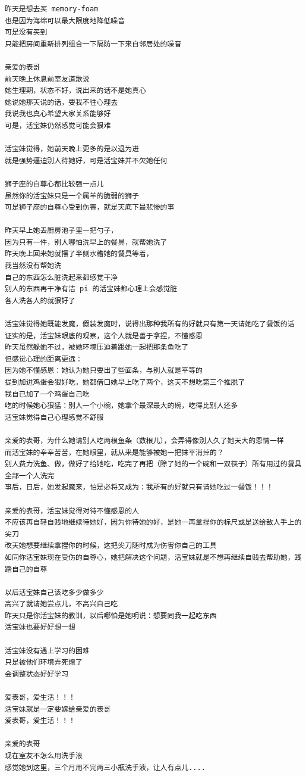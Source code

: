 \documentclass[9pt, b5paper]{article}
\begin{document}
\begin{enumerate}
\begin{verbatim}
昨天是想去买 memory-foam
也是因为海绵可以最大限度地降低噪音
可是没有买到
只能把房间重新排列组合一下隔防一下来自邻居处的噪音

亲爱的表哥
前天晚上休息前室友道歉说
她生理期，状态不好，说出来的话不是她真心
她说她那天说的话，要我不往心理去
我说我也真心希望大家关系能够好
可是，活宝妹仍然感觉可能会狠难

活宝妹觉得，她前天晚上更多的是以退为进
就是强势逼迫别人待她好，可是活宝妹并不欠她任何

狮子座的自尊心都比较强一点儿
虽然你的活宝妹只是一个属羊的脆弱的狮子
可是狮子座的自尊心受到伤害，就是天底下最悲惨的事

昨天早上她丢厨房池子里一把勺子，
因为只有一件，别人哪怕洗早上的餐具，就帮她洗了
昨天晚上回来她就摆了半侧水槽她的餐具等着，
我当然没有帮她洗
自己的东西怎么脏洗起来都感觉干净
别人的东西再干净有洁 pi 的活宝妹都心理上会感觉脏
各人洗各人的就狠好了

活宝妹觉得她既能发魔，假装发魔时，说得出那种我所有的好就只有第一天请她吃了餐饭的话
证实的是，活宝妹眼底的观察，这个人就是善于拿捏，不懂感恩
昨天虽然躲她不过，被她环境压迫着跟她一起把那条鱼吃了
但感觉心理的距离更远：
因为她不懂感恩：她认为她只要出了些面条，与别人就是平等的
提到加进鸡蛋会狠好吃，她都借口她早上吃了两个，这天不想吃第三个推脱了
我自已加了一个鸡蛋自己吃
吃的时候她心狠猛：别人一个小碗，她拿个最深最大的碗，吃得比别人还多
活宝妹觉得自己心理感觉不舒服

亲爱的表哥，为什么她请别人吃两根鱼条（数根儿），会弄得像别人久了她天大的恩情一样
而活宝妹的辛辛苦苦，在她眼里，就从来是能够被她一把抹平消掉的？
别人费力洗鱼、做，做好了给她吃，吃完了再把（除了她的一个碗和一双筷子）所有用过的餐具全部一个人洗完
事后，日后，她发起魔来，怕是必将又成为：我所有的好就只有请她吃过一餐饭！！！

亲爱的表哥，活宝妹觉得对待不懂感恩的人
不应该再自轻自贱地继续待她好，因为你待她的好，是她一再拿捏你的标尺或是送给敌人手上的尖刀
改天她想要继续拿捏你的时候，这把尖刀随时成为伤害你自己的工具
如同你活宝妹现在受伤的自尊心，她把解决这个问题，活宝妹就是不想再继续自贱去帮助她，践踏自己的自尊

以后活宝妹自己该吃多少做多少
高兴了就请她尝点儿，不高兴自己吃
昨天只是你活宝妹的教训，以后哪怕是她明说：想要同我一起吃东西
活宝妹也要好好想一想

活宝妹没有遇上学习的困难
只是被他们环境弄死熄了
会调整状态好好学习

爱表哥，爱生活！！！
活宝妹就是一定要嫁给亲爱的表哥
爱表哥，爱生活！！！

亲爱的表哥
现在室友不怎么用洗手液
感觉她到这里，三个月用不完两三小瓶洗手液，让人有点儿....


\end{verbatim}
\end{enumerate}
\end{document}
